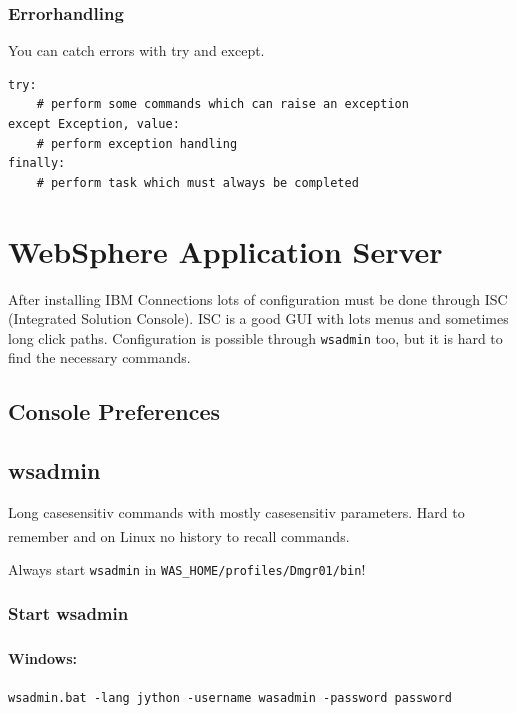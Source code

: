 \documentclass[12pt,a4paper]{article}
\begin{document}
\subsubsection{Errorhandling}

You can catch errors with try and except.

\begin{lstlisting}[style=python]
try:
    # perform some commands which can raise an exception
except Exception, value:
    # perform exception handling
finally: 
    # perform task which must always be completed
\end{lstlisting}

\section{WebSphere Application Server}

After installing IBM Connections lots of configuration must be done through ISC (Integrated Solution Console). ISC is a good GUI with lots menus and sometimes long click paths. Configuration is possible through \texttt{wsadmin} too, but it is hard to find the necessary commands.

\subsection{Console Preferences}

\subsection{wsadmin}

Long casesensitiv commands with mostly casesensitiv parameters. Hard to remember and on Linux\textsuperscript{\textregistered} no history to recall commands.

Always start \texttt{wsadmin} in \lstinline[style=BashInputStyle]{WAS_HOME/profiles/Dmgr01/bin}! 

\subsubsection{Start wsadmin}

\paragraph{Windows\textsuperscript{\textregistered}:}

\lstinline[style=command.com]{wsadmin.bat -lang jython -username wasadmin -password password}
\end{document}
